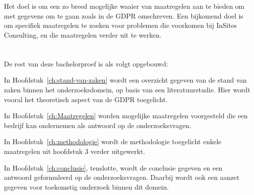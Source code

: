 \section{}
\label{sec:onderzoeksdoelstelling}

Het doel is om een zo breed mogelijke waaier van maatregelen aan te bieden om met gegevens om te gaan zoals in de GDPR omschreven. 
Een bijkomend doel is om specifiek maatregelen te zoeken voor problemen die voorkomen bij InSites Consulting, en die maatregelen verder uit te werken. 

\section{}
\label{sec:opzet-bachelorproef}


De rest van deze bachelorproef is als volgt opgebouwd:

In Hoofdstuk~\ref{ch:stand-van-zaken} wordt een overzicht gegeven van de stand van zaken binnen het onderzoeksdomein, op basis van een literatuurstudie. Hier wordt vooral het theoretisch aspect van de GDPR toegelicht. 

In Hoofdstuk~\ref{ch:Maatregelen} worden mogelijke maatregelen voorgesteld die een bedrijf kan ondernemen als antwoord op de onderzoeksvragen. 

In Hoofdstuk~\ref{ch:methodologie} wordt de methodologie toegelicht enkele maatregelen uit hoofdstuk 3 verder uitgewerkt.


In Hoofdstuk~\ref{ch:conclusie}, tenslotte, wordt de conclusie gegeven en een antwoord geformuleerd op de onderzoeksvragen. Daarbij wordt ook een aanzet gegeven voor toekomstig onderzoek binnen dit domein.
